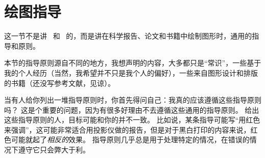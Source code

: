 %
%
%


\section{绘图指导}

\bohs

这一节不是讲 \pgfname\ 和 \tikzname\ 的，而是讲在科学报告、论文和书籍中绘制图形时，通用的指导和原则。

本节的指导原则源自不同的地方，我想声明的内容，大多都只是“常识”，一些基于我的个人经历（当然，我希望并不只是我个人的偏好），一些来自图形设计和排版的书籍（还没写参考文献，见谅）。

当有人给你列出一堆指导原则时，你首先得问自己：我真的应该遵循这些指导原则吗？
这是个重要的问题，因为有很多好理由不去遵循这些通用的指导原则。
给出这些指导原则的人，目标可能和你的并不一致。
比如说，某条指导可能写“用红色来强调”，这可能非常适合用投影仪做的报告，但是对于黑白打印的内容来说，红色可能就起了\emph{相反的}效果。
指导原则几乎总是用于处理特定的情况，在错误的情况下遵守它只会弊大于利。

